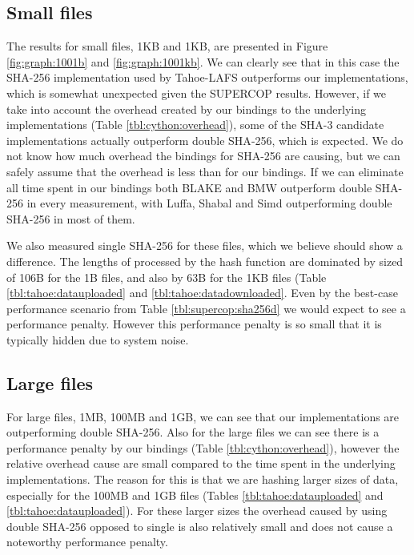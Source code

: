 \documentclass[english,12pt,a4paper]{book}
\begin{document}
\subsection{Small files}
The results for small files, 1KB and 1KB, are presented in Figure
\ref{fig:graph:1001b} and \ref{fig:graph:1001kb}. We can clearly see that in
this case the \ac{SHA}-256 implementation used by Tahoe-\ac{LAFS} outperforms
our implementations, which is somewhat unexpected given the \ac{SUPERCOP}
results. However, if we take into account the overhead created by our bindings
to the underlying implementations (Table \ref{tbl:cython:overhead}), some of the
\ac{SHA}-3 candidate implementations actually outperform double \ac{SHA}-256,
which is expected. We do not know how much overhead the bindings for
\ac{SHA}-256 are causing, but we can safely assume that the overhead is less
than for our bindings. If we can eliminate all time spent in our bindings both
BLAKE and \ac{BMW} outperform double \ac{SHA}-256 in every measurement, with
Luffa, Shabal and Simd outperforming double \ac{SHA}-256 in most of them.

We also measured single \ac{SHA}-256 for these files, which we believe should
show a difference. The lengths of processed by the hash function are dominated
by sized of 106B for the 1B files, and also by 63B for the 1KB files (Table
\ref{tbl:tahoe:datauploaded} and \ref{tbl:tahoe:datadownloaded}. Even by the
best-case performance scenario from Table \ref{tbl:supercop:sha256d} we would
expect to see a performance penalty. However this performance penalty is so
small that it is typically hidden due to system noise.   

\subsection{Large files}
For large files, 1MB, 100MB and 1GB, we can see that our implementations are
outperforming double \ac{SHA}-256. Also for the large files we can see there is
a performance penalty by our bindings (Table \ref{tbl:cython:overhead}),
however the relative overhead cause are small compared to the time spent in the
underlying implementations. The reason for this is that we are hashing larger
sizes of data, especially for the 100MB and 1GB files (Tables
\ref{tbl:tahoe:datauploaded} and \ref{tbl:tahoe:datauploaded}). For these
larger sizes the overhead caused by using double \ac{SHA}-256 opposed to single
is also relatively small and does not cause a noteworthy performance penalty.
\end{document}
